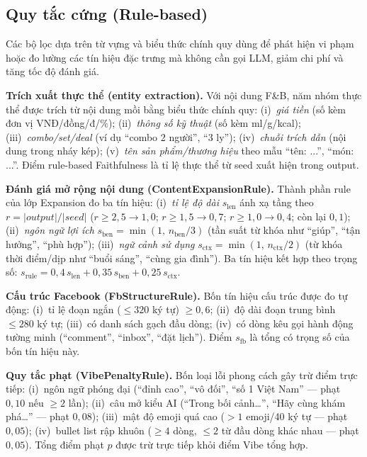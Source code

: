 \subsection{Quy tắc cứng (Rule-based)}

Các bộ lọc dựa trên từ vựng và biểu thức chính quy
dùng để phát hiện vi phạm hoặc đo lường các tín
hiệu đặc trưng mà không cần gọi LLM, giảm chi phí và
tăng tốc độ đánh giá.

\textbf{Trích xuất thực thể (entity extraction).}
Với nội dung F\&B, năm nhóm thực thể được trích từ
nội dung mồi bằng biểu thức chính quy:
(i)~\emph{giá tiền} (số kèm đơn vị VNĐ/đồng/đ/\%);
(ii)~\emph{thông số kỹ thuật} (số kèm ml/g/kcal);
(iii)~\emph{combo/set/deal} (ví dụ ``combo 2 người'',
``3 ly''); (iv)~\emph{chuỗi trích dẫn} (nội dung trong
nháy kép); (v)~\emph{tên sản phẩm/thương hiệu} theo
mẫu ``tên: ...'', ``món: ...''. Điểm rule-based
Faithfulness là tỉ lệ thực thể từ seed xuất hiện trong
output.

\textbf{Đánh giá mở rộng nội dung (ContentExpansionRule).}
Thành phần rule của lớp Expansion đo ba tín hiệu:
(i)~\emph{tỉ lệ độ dài} $s_{\text{len}}$ ánh xạ tầng
theo $r = |output|/|seed|$ ($r \geq 2{,}5 \to 1{,}0$;
$r \geq 1{,}5 \to 0{,}7$; $r \geq 1{,}0 \to 0{,}4$;
còn lại $0{,}1$); (ii)~\emph{ngôn ngữ lợi ích}
$s_{\text{ben}} = \min(1,\,n_{\text{ben}}/3)$ (tần
suất từ khóa như ``giúp'', ``tận hưởng'', ``phù hợp'');
(iii)~\emph{ngữ cảnh sử dụng} $s_{\text{ctx}} =
\min(1,\,n_{\text{ctx}}/2)$ (từ khóa thời điểm/dịp
như ``buổi sáng'', ``cùng gia đình''). Ba tín hiệu
kết hợp theo trọng số:
$s_{\text{rule}} = 0{,}4\,s_{\text{len}} +
0{,}35\,s_{\text{ben}} + 0{,}25\,s_{\text{ctx}}$.

\textbf{Cấu trúc Facebook (FbStructureRule).}
Bốn tín hiệu cấu trúc được đo tự động:
(i)~tỉ lệ đoạn ngắn ($\leq 320$ ký tự)
$\geq 0{,}6$; (ii)~độ dài đoạn trung bình $\leq 280$
ký tự; (iii)~có danh sách gạch đầu dòng;
(iv)~có dòng kêu gọi hành động tường minh
(``comment'', ``inbox'', ``đặt lịch''). Điểm
$s_{\text{fb}}$ là tổng có trọng số của bốn tín
hiệu này.

\textbf{Quy tắc phạt (VibePenaltyRule).}
Bốn loại lỗi phong cách gây trừ điểm trực tiếp:
(i)~ngôn ngữ phóng đại (``đỉnh cao'', ``vô đối'',
``số 1 Việt Nam'' --- phạt $0{,}10$ nếu $\geq 2$
lần); (ii)~câu mở kiểu AI (``Trong bối cảnh\ldots'',
``Hãy cùng khám phá\ldots'' --- phạt $0{,}08$);
(iii)~mật độ emoji quá cao ($>1$ emoji/40 ký tự ---
phạt $0{,}05$); (iv)~bullet list rập khuôn ($\geq 4$
dòng, $\leq 2$ từ đầu dòng khác nhau --- phạt
$0{,}05$). Tổng điểm phạt $p$ được trừ trực tiếp
khỏi điểm Vibe tổng hợp.

